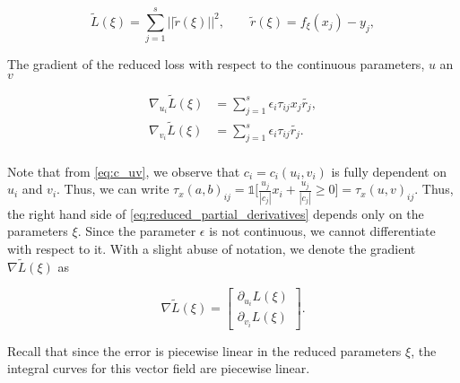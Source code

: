 \begin{equation}
    \tilde{L}(\xi) = \sum_{j=1}^s ||\tilde{r}(\xi)||^2, \qquad \tilde{r}(\xi) = f_\xi(x_j) - y_j,
\end{equation}

The gradient of the reduced loss with respect to the continuous parameters, $u$ an $v$

\begin{equation}\label{eq:reduced_partial_derivatives}
\begin{aligned}
    \nabla_{u_i} \tilde{L}(\xi) &= \sum_{j=1}^s \epsilon_i \tau_{ij} x_j \tilde{r_j},\\
    \nabla_{v_i} \tilde{L}(\xi) &= \sum_{j=1}^s \epsilon_i \tau_{ij} \tilde{r_j}.\\
\end{aligned}  
\end{equation}

Note that from \eqref{eq:c_uv}, we observe that $c_i = c_i(u_i, v_i)$ is fully dependent on $u_i$ and $v_i$. Thus, we can write $\tau_x(a, b)_{ij} = \mathds{1}\big[\frac{u_j}{|c_j|}x_i + \frac{u_j}{|c_j|} \geq 0\big] = \tau_x(u, v)_{ij}$. Thus, the right hand side of \eqref{eq:reduced_partial_derivatives} depends only on the parameters $\xi$. Since the parameter $\epsilon$ is not continuous, we cannot differentiate with respect to it. With a slight abuse of notation, we denote the gradient $\nabla \tilde{L}(\xi)$ as

\begin{equation}\label{eq:reduced_gradient}
    \nabla \tilde{L}(\xi) = \begin{bmatrix} \partial_{u_i} L(\xi) \\ \partial_{v_i} L(\xi) \end{bmatrix}.
\end{equation}


Recall that since the error is piecewise linear in the reduced parameters $\xi$, the integral curves for this vector field are piecewise linear.

